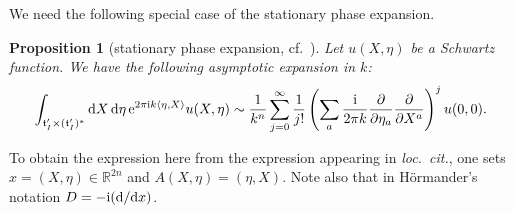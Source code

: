 \documentclass[11pt]{article}
\numberwithin{equation}{section}
\newtheorem{Proposition}[Theorem]{Proposition}
{ \theoremstyle{definition}
\newtheorem{Definition}[Theorem]{Definition}
\newtheorem{Remark}[Theorem]{Remark} }
\newcommand{\pair}[2]{\langle #1, #2 \rangle}
\renewcommand{\i}{{\mathrm{i}}}
\def\t{\ensuremath{\mathfrak{t}}}
\def\bR{\ensuremath{\mathbb{R}}}
\begin{document}
We need the following special case of the stationary phase expansion.
\begin{Proposition}[{stationary phase expansion, cf.~\cite[Lemma 7.7.3]{Hormander1}}]
Let $u(X,\eta)$ be a Schwartz function. We have the following asymptotic expansion in $k$:
\[ \int_{\t_I^\prime \times (\t_I^\prime)^\ast}{\rm d}X\, {\rm d}\eta\, {\rm e}^{2\pi \i k\pair{\eta}{X}}u(X,\eta)\sim \frac{1}{k^n}\sum_{j=0}^\infty \frac{1}{j!} \left(\sum_a \frac{\i}{2\pi k}\frac{\partial}{\partial \eta_a}\frac{\partial}{\partial X^a}\right)^j u(0,0).\]
\end{Proposition}
\begin{Remark}
To obtain the expression here from the expression appearing in \emph{loc.\ cit.}, one sets $x=(X,\eta) \in \bR^{2n}$ and $A(X,\eta)=(\eta,X)$. Note also that in H{\"o}rmander's notation $D=-\i({\rm d}/{\rm d}x)$.
\end{Remark}
\end{document}
